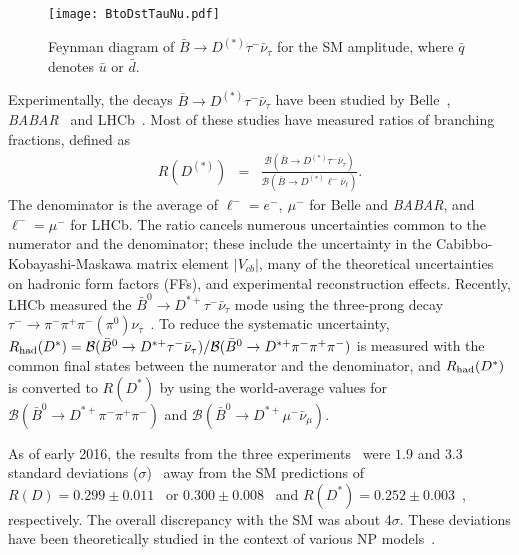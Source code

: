 \documentclass[aps,prd,twocolumn,superscriptaddress,showpacs,preprintnumbers,amsmath,amssymb]{revtex4-1}
\begin{document}
\begin{figure}[b!]
  \centering
  \texttt{[image: BtoDstTauNu.pdf]}
  \caption{Feynman diagram of $\bar{B} \rightarrow D^{(*)} \tau^- \bar{\nu}_\tau$ for the SM amplitude, where $\bar{q}$ denotes $\bar{u}$ or $\bar{d}$.}
  \label{fig:Feynman}
\end{figure}

Experimentally, the decays $\bar{B} \to D^{(*)} \tau^- \bar{\nu}_\tau$ have been studied by Belle~\cite{cite:Belle:2007, cite:Belle:2010, cite:Belle:2015, cite:Belle:2016}, \textit{BABAR}~\cite{cite:BaBar:2008, cite:BaBar:2012:letter, cite:BaBar:2013:fullpaper} and LHCb~\cite{cite:LHCb:2015}. Most of these studies have measured ratios of branching fractions, defined as
\begin{eqnarray}
  R(D^{(*)}) &=& \frac{\mathcal{B}(\bar{B} \to D^{(*)} \tau^- \bar{\nu}_\tau)}{\mathcal{B}(\bar{B} \to D^{(*)} \ell^- \bar{\nu}_\ell)}.
\end{eqnarray}
The denominator is the average of $\ell^- = e^-,~\mu^-$ for Belle and \textit{BABAR}, and $\ell^- = \mu^-$ for LHCb. The ratio cancels numerous uncertainties common to the numerator and the denominator; these include the uncertainty in the Cabibbo-Kobayashi-Maskawa matrix element $|V_{cb}|$, many of the theoretical uncertainties on hadronic form factors (FFs), and experimental reconstruction effects. Recently, LHCb measured the $\bar{B}^0 \rightarrow D^{*+} \tau^- \bar{\nu}_\tau$ mode using the three-prong decay $\tau^- \rightarrow \pi^- \pi^+ \pi^- (\pi^0) \nu_\tau$~\cite{cite:LHCb:2017}. To reduce the systematic uncertainty, $R_{\rm had}(D^*) = \mathcal{B}(\bar{B}^0 \to D^{*+} \tau^- \bar{\nu}_\tau) / \mathcal{B}(\bar{B}^0 \to D^{*+} \pi^- \pi^+ \pi^-)$ is measured with the common final states between the numerator and the denominator, and $R_{\rm had}(D^*)$ is converted to $R(D^*)$ by using the world-average values for $\mathcal{B}(\bar{B}^0 \to D^{*+} \pi^- \pi^+ \pi^-)$ and $\mathcal{B}(\bar{B}^0 \to D^{*+} \mu^- \bar{\nu}_\mu)$.

As of early 2016, the results from the three experiments~\cite{cite:Belle:2015,cite:Belle:2016,cite:BaBar:2012:letter,cite:BaBar:2013:fullpaper,cite:LHCb:2015} were $1.9$ and $3.3$ standard deviations ($\sigma$)~\cite{cite:HFLAV:2014} away from the SM predictions of $R(D) = 0.299 \pm 0.011$~\cite{cite:RD_FermiandMILC:2015} or $0.300 \pm 0.008$~\cite{cite:RD_HPQCD:2015} and $R(D^*) = 0.252 \pm 0.003$~\cite{cite:RDst:2012}, respectively. The overall discrepancy with the SM was about 4$\sigma$. These deviations have been theoretically studied in the context of various NP models~\cite{cite:RDst:2012, cite:Datta:2012, cite:Celis:2013, cite:Tanaka:2013, cite:Biancofiore:2013, cite:Dorsner:2013, cite:Sakaki:2013, cite:Hagiwara:2014, cite:Duraisamy:2014, cite:Sakaki:2015, cite:Freytsis:2015, cite:Li:2016, cite:Bhattacharya:2016, cite:Bardhan:2017, cite:Celis:2017}.
\end{document}
